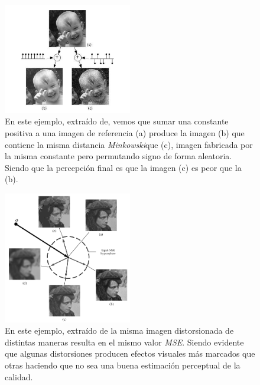 \begin{figure}[htp]
  \begin{center}
    \includegraphics[width=0.5\textwidth]{imagenes/Chapter1/failure_minkowski_metric.png}
  \end{center}
  \caption{En este ejemplo, extraído de\cite{MinkowskiFailure},
  vemos que sumar una constante positiva a una imagen  de referencia (a) produce la imagen (b) que contiene la misma distancia \emph{Minkowski}\footnotemark[1]
  que (c), imagen fabricada por la misma constante pero permutando signo de forma aleatoria. Siendo que
  la percepción final es que la imagen (c) es peor que la (b).
\label{fig:FailureMinkowskiMetric}}
\end{figure}
\begin{figure}[htp]
  \begin{center}
    \includegraphics[width=0.5\textwidth]{imagenes/Chapter1/MSE_Hypersphere.png}
  \end{center}
  \caption{En este ejemplo, extraído de\cite{Wang2006ModernIQ} la misma imagen distorsionada de distintas maneras
  resulta en el mismo valor \emph{MSE}. Siendo evidente que 
  algunas distorsiones producen efectos visuales más marcados que otras haciendo 
  que no sea una buena estimación perceptual de la calidad.}
  \label{fig:MSEHyperSphere}
\end{figure}

